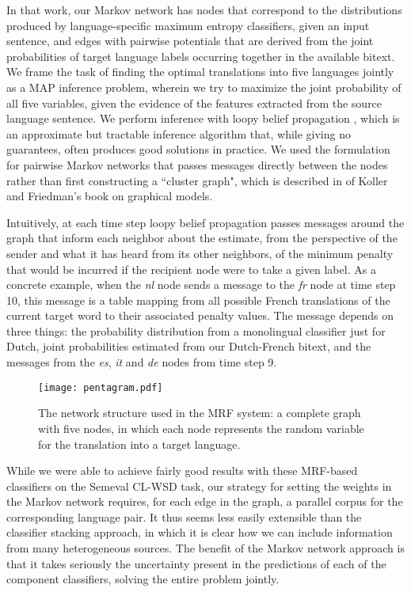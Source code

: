 In that work, our Markov network has nodes that correspond to the distributions
produced by language-specific maximum entropy classifiers, given an input
sentence, and edges with pairwise potentials that are derived from the joint
probabilities of target language labels occurring together in the available
bitext.
We frame the task of finding the optimal translations into five languages
jointly as a MAP inference problem, wherein we try to maximize the joint
probability of all five variables, given the evidence of the features extracted
from the source language sentence.
We perform inference with loopy belief propagation
\cite{DBLP:conf/uai/MurphyWJ99}, which is an approximate but tractable
inference algorithm that, while giving no guarantees, often produces good
solutions in practice.
We used the formulation for pairwise Markov networks that passes messages
directly between the nodes rather than first constructing a ``cluster graph",
which is described in \cite[\S 11.3.5.1]{Koller+Friedman:09} of Koller and
Friedman's book on graphical models.

Intuitively, at each time step loopy belief propagation passes messages around
the graph that inform each neighbor about the estimate, from the perspective of
the sender and what it has heard from its other neighbors, of the minimum
penalty that would be incurred if the recipient node were to take a given
label. As a concrete example, when the \emph{nl} node sends a message to the
\emph{fr} node at time step 10, this message is a table mapping from all
possible French translations of the current target word to their associated
penalty values. The message depends on three things: the probability
distribution from a monolingual classifier just for Dutch, joint probabilities
estimated from our Dutch-French bitext, and the messages from the \emph{es},
\emph{it} and \emph{de} nodes from time step 9.

\begin{figure}
  \begin{center}
  \texttt{[image: pentagram.pdf]}
  \end{center}
  \caption{The network structure used in the MRF system: a complete graph with
  five nodes, in which each node represents the random variable for the
  translation into a target language.}
  \label{fig:pentagram}
\end{figure}

While we were able to achieve fairly good results with these MRF-based
classifiers on the Semeval CL-WSD task, our strategy for setting the weights in
the Markov network requires, for each edge in the graph, a parallel corpus for
the corresponding language pair.
It thus seems less easily extensible than the classifier stacking approach, in
which it is clear how we can include information from many heterogeneous
sources. The benefit of the Markov network approach is that it takes seriously
the uncertainty present in the predictions of each of the component
classifiers, solving the entire problem jointly.

